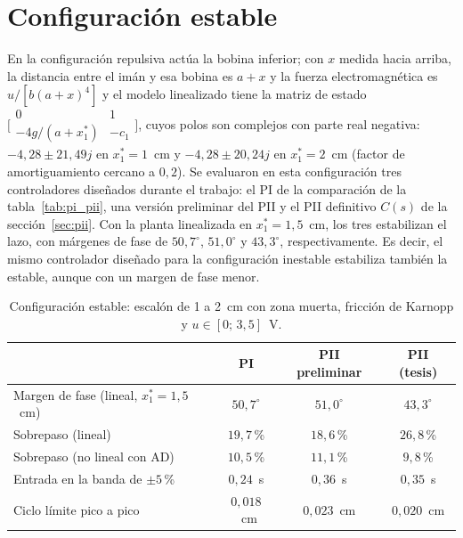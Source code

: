 \section{Configuración estable}

En la configuración repulsiva actúa la bobina inferior; con $x$ medida hacia arriba, la distancia entre el imán y esa bobina es $a+x$ y la fuerza electromagnética es $u/[b(a+x)^4]$ y el modelo linealizado tiene la matriz de estado $\bigl[\begin{smallmatrix}0&1\\-4g/(a+x_1^*)&-c_1\end{smallmatrix}\bigr]$, cuyos polos son complejos con parte real negativa: $-4{,}28\pm21{,}49j$ en $x_1^*=1$~cm y $-4{,}28\pm20{,}24j$ en $x_1^*=2$~cm (factor de amortiguamiento cercano a $0{,}2$). Se evaluaron en esta configuración tres controladores diseñados durante el trabajo: el PI de la comparación de la tabla~\ref{tab:pi_pii}, una versión preliminar del PII y el PII definitivo $C(s)$ de la sección~\ref{sec:pii}. Con la planta linealizada en $x_1^*=1{,}5$~cm, los tres estabilizan el lazo, con márgenes de fase de $50{,}7^\circ$, $51{,}0^\circ$ y $43{,}3^\circ$, respectivamente. Es decir, el mismo controlador diseñado para la configuración inestable estabiliza también la estable, aunque con un margen de fase menor.

\begin{table}[ht]
\centering
\caption{Configuración estable: escalón de 1 a 2~cm con zona muerta, fricción de Karnopp y $u\in[0;\,3{,}5]$~V.}
\label{tab:p8_estable}
\begin{tabular}{|l|c|c|c|}
\hline
 & PI & PII preliminar & PII (tesis) \\ \hline
Margen de fase (lineal, $x_1^*=1{,}5$~cm) & $50{,}7^\circ$ & $51{,}0^\circ$ & $43{,}3^\circ$ \\ \hline
Sobrepaso (lineal) & $19{,}7$\,\% & $18{,}6$\,\% & $26{,}8$\,\% \\ \hline
Sobrepaso (no lineal con AD) & $10{,}5$\,\% & $11{,}1$\,\% & $9{,}8$\,\% \\ \hline
Entrada en la banda de $\pm5$\,\% & $0{,}24$~s & $0{,}36$~s & $0{,}35$~s \\ \hline
Ciclo límite pico a pico & $0{,}018$~cm & $0{,}023$~cm & $0{,}020$~cm \\ \hline
\end{tabular}
\end{table}

